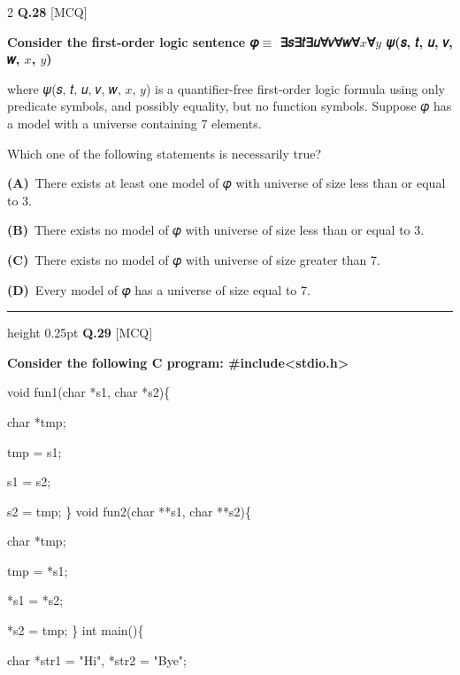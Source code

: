 \documentclass[a4paper,10pt,twoside]{article}
\begin{document}
\begin{multicols}{2}
\noindent\textbf{Q.28} \hfill {\footnotesize\textsf{[MCQ]}}
\par\vspace{2pt}
{\bfseries Consider the first-order logic sentence
𝜑$\equiv$ ∃𝑠∃𝑡∃𝑢∀𝑣∀𝑤∀$x$∀$y$ 𝜓(𝑠, 𝑡, 𝑢, 𝑣, 𝑤, $x$, $y$)
\par\smallskip
where 𝜓(𝑠, 𝑡, 𝑢, 𝑣, 𝑤, $x$, $y$) is a quantifier-free first-order logic formula using only predicate
symbols, and possibly equality, but no function symbols. Suppose 𝜑 has a model with a
universe containing 7 elements.
\par\smallskip
Which one of the following statements is necessarily true? \par}
\par\vspace{2pt}\noindent
\textbf{(A)}~There exists at least one model of 𝜑 with universe of size less than or equal to 3.\par\vspace{2pt}\noindent
\textbf{(B)}~There exists no model of 𝜑 with universe of size less than or equal to 3.\par\vspace{2pt}\noindent
\textbf{(C)}~There exists no model of 𝜑 with universe of size greater than 7.\par\vspace{2pt}\noindent
\textbf{(D)}~Every model of 𝜑 has a universe of size equal to 7.
\par\vspace{6pt}\hrule height 0.25pt\vspace{6pt}
\noindent\textbf{Q.29} \hfill {\footnotesize\textsf{[MCQ]}}
\par\vspace{2pt}
{\bfseries Consider the following C program:
\#include<stdio.h>
\par\smallskip
void fun1(char *s1, char *s2)\{
\par\smallskip
char *tmp;
\par\smallskip
tmp = s1;
\par\smallskip
s1 = s2;
\par\smallskip
s2 = tmp;
\}
void fun2(char **s1, char **s2)\{
\par\smallskip
char *tmp;
\par\smallskip
tmp = *s1;
\par\smallskip
*s1 = *s2;
\par\smallskip
*s2 = tmp;
\}
int main()\{
\par\smallskip
char *str1 = "Hi", *str2 = "Bye";
\par\smallskip
}
\end{multicols}
\end{document}
